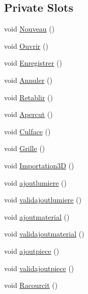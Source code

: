 \subsection*{Private Slots}
\begin{DoxyCompactItemize}
\item 
void \hyperlink{class_main_window_a6f837f331c40d27e47fbb0d6a73b040e}{Nouveau} ()
\item 
void \hyperlink{class_main_window_adbc60f34a13a49cc015dc4a124a588a1}{Ouvrir} ()
\item 
void \hyperlink{class_main_window_a8c07d91b87178ac0a1b88aabc45c6ddb}{Enregistrer} ()
\item 
void \hyperlink{class_main_window_a5277087cb1c0b01722b7a4ff436070ba}{Annuler} ()
\item 
void \hyperlink{class_main_window_ab2ff5da91852950471811fa93028dc0c}{Retablir} ()
\item 
void \hyperlink{class_main_window_a019328eaf07af3c9b8850e3db14fdf30}{Apercut} ()
\item 
void \hyperlink{class_main_window_a0b391dfd82e868b6f8badbc9717d6f49}{Culface} ()
\item 
void \hyperlink{class_main_window_a9a4d5849cf40a3ce50941e56cfa0be35}{Grille} ()
\item 
void \hyperlink{class_main_window_af26018b1d699cbf0a3f62048472cc489}{Importation3\+D} ()
\item 
void \hyperlink{class_main_window_a42d29fe9a2657a5c5563b3f1235a28e4}{ajoutlumiere} ()
\item 
void \hyperlink{class_main_window_a56f65a459f0caca9f71251663b200431}{validajoutlumiere} ()
\item 
void \hyperlink{class_main_window_a3a599353265f9c01a8780529aa5fed75}{ajoutmaterial} ()
\item 
void \hyperlink{class_main_window_a2d8cee622b78ccdeed758c51b9fb5b0e}{validajoutmaterial} ()
\item 
void \hyperlink{class_main_window_a6661770cd92877aa3b1c0dae91513a50}{ajoutpiece} ()
\item 
void \hyperlink{class_main_window_ada60d01c441123e1b7d4d30be1d16f8f}{validajoutpiece} ()
\item 
void \hyperlink{class_main_window_abd2acb261445354d2fd680c9b48bad77}{Racourcit} ()
\end{DoxyCompactItemize}
